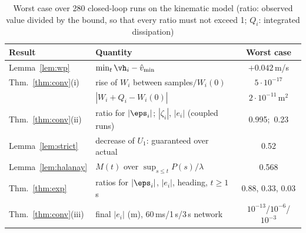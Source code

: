 \begin{table}[t]
\caption{Worst case over 280 closed-loop runs on the kinematic model (ratio: observed value divided by the bound, so that every ratio must not exceed 1; $Q_i$: integrated dissipation)}\label{tab:verif}
\centering\footnotesize
\setlength{\tabcolsep}{3pt}
\begin{tabular}{@{}llc@{}}
\toprule
Result & Quantity & Worst case\\
\midrule
Lemma~\ref{lem:wp} & $\min_t\vh_i-\hat v_{\min}$ & $+0.042$\,m/s\\
Thm.~\ref{thm:conv}(i) & rise of $W_i$ between samples$/W_i(0)$ & $5\cdot10^{-17}$\\
 & $|W_i+Q_i-W_i(0)|$ & $2\cdot10^{-11}$\,m$^2$\\
Thm.~\ref{thm:conv}(ii) & ratio for $|\eps_i|$; $|\zeta_i|$, $|e_i|$ (coupled runs) & 0.995;\ 0.23\\
Lemma~\ref{lem:strict} & decrease of $U_1$: guaranteed over actual & 0.52\\
Lemma~\ref{lem:halanay} & $M(t)$ over $\sup_{s\le t}P(s)/\lambda$ & 0.568\\
Thm.~\ref{thm:exp} & ratios for $|\eps_i|$, $|e_i|$, heading, $t\ge1$\,s & 0.88, 0.33, 0.03\\
Thm.~\ref{thm:conv}(iii) & final $|e_i|$ (m), 60\,ms/1\,s/3\,s network & $10^{-13}$/$10^{-6}$/$10^{-3}$\\
\bottomrule
\end{tabular}
\end{table}
